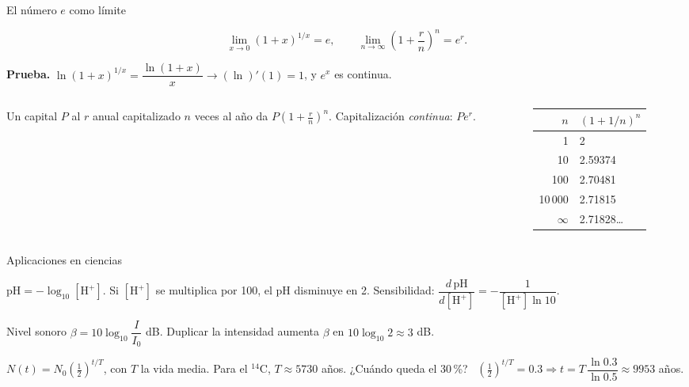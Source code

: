 \documentclass[10pt,aspectratio=169]{beamer}
\begin{document}
\begin{frame}{El número $e$ como límite}
  \begin{teorema}
    \[ \lim_{x\to0}(1+x)^{1/x}=e,\qquad \lim_{n\to\infty}\left(1+\frac{r}{n}\right)^n=e^r. \]
  \end{teorema}
  \textbf{Prueba.} $\ln(1+x)^{1/x}=\dfrac{\ln(1+x)}{x}\to(\ln)'(1)=1$, y $e^x$ es continua.
  \begin{columns}
    \begin{column}{0.5\textwidth}
      \begin{ejemplo}
        Un capital $P$ al $r$ anual capitalizado $n$ veces al año da $P(1+\frac rn)^{n}$.
        Capitalización \emph{continua}: $Pe^{r}$.
      \end{ejemplo}
    \end{column}
    \begin{column}{0.5\textwidth}
      \centering\small
      \begin{tabular}{r|l}
        $n$ & $(1+1/n)^n$\\ \hline
        1 & 2\\
        10 & 2.59374\\
        100 & 2.70481\\
        10\,000 & 2.71815\\
        $\infty$ & 2.71828\dots
      \end{tabular}
    \end{column}
  \end{columns}
\end{frame}

\begin{frame}{Aplicaciones en ciencias}
  \begin{ejemplo}[química: pH]
    $\mathrm{pH}=-\log_{10}[\mathrm{H^+}]$. Si $[\mathrm{H^+}]$ se multiplica por 100, el pH disminuye en 2.
    Sensibilidad: $\dfrac{d\,\mathrm{pH}}{d[\mathrm{H^+}]}=-\dfrac{1}{[\mathrm{H^+}]\ln10}$.
  \end{ejemplo}
  \begin{ejemplo}
    Nivel sonoro $\beta=10\log_{10}\dfrac{I}{I_0}$ dB. Duplicar la intensidad aumenta $\beta$ en
    $10\log_{10}2\approx3$ dB.
  \end{ejemplo}
  \begin{ejemplo}
    $N(t)=N_0\left(\tfrac12\right)^{t/T}$, con $T$ la vida media. Para el $^{14}$C, $T\approx5730$ años.
    ¿Cuándo queda el 30\,\%? \ $\left(\frac12\right)^{t/T}=0.3\Rightarrow t=T\,\dfrac{\ln0.3}{\ln0.5}\approx9953$ años.
  \end{ejemplo}
\end{frame}
\end{document}
